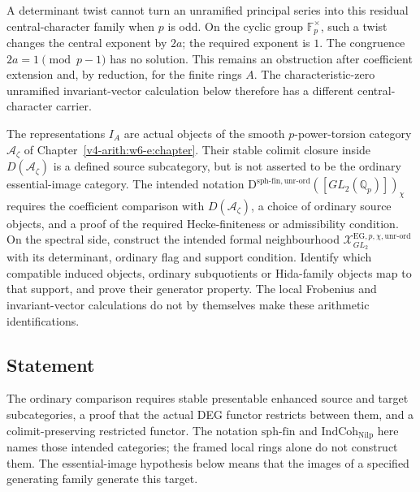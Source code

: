 A determinant twist cannot turn an unramified principal series into
this residual central-character family when $p$ is odd. On the cyclic
group $\mathbb F_p^\times$, such a twist changes the central exponent
by $2a$; the required exponent is $1$. The congruence
$2a=1\pmod{p-1}$ has no solution. This remains an obstruction after
coefficient extension and, by reduction, for the finite rings $A$.
The characteristic-zero unramified invariant-vector calculation below
therefore has a different central-character carrier.

\begin{definition}
\label{v4-arith:w5-e:def:unr-ord}
The representations $I_A$ are actual objects of the smooth
$p$-power-torsion category $\mathcal A_\zeta$ of
Chapter~\ref{v4-arith:w6-e:chapter}. Their stable colimit closure
inside $D(\mathcal A_\zeta)$ is a defined source subcategory, but is
not asserted to be the ordinary essential-image category.
The intended notation
$\mathrm D^{\mathrm{sph\text{-}fin,unr\text{-}ord}}
([GL_2(\mathbb Q_p)])_\chi$ requires the coefficient comparison with
$D(\mathcal A_\zeta)$, a choice of ordinary source objects, and a
proof of the required Hecke-finiteness or admissibility condition.
On the spectral side, construct the intended formal neighbourhood
$\mathcal X^{\mathrm{EG},p,\chi,\mathrm{unr\text{-}ord}}_{GL_2}$
with its determinant, ordinary flag and support condition. Identify
which compatible induced objects, ordinary subquotients or Hida-family
objects map to that support, and prove their generator property.
The local Frobenius and invariant-vector calculations do not by
themselves make these arithmetic identifications.
\end{definition}

\subsection{Statement}
The ordinary comparison requires stable presentable enhanced source and
target subcategories, a proof that the actual DEG functor restricts
between them, and a colimit-preserving restricted functor. The notation
$\mathrm{sph\text{-}fin}$ and $\mathrm{IndCoh}_{\mathrm{Nilp}}$ here
names those intended categories; the framed local rings alone do not
construct them. The essential-image hypothesis below means that the
images of a specified generating family generate this target.


